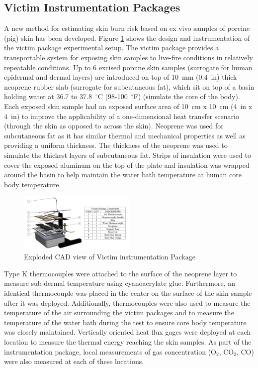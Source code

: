 \documentclass[12pt,oneside]{book}
\begin{document}
\subsection{Victim Instrumentation Packages}
A new method for estimating skin burn risk based on ex vivo samples of porcine (pig) skin has been developed. Figure \ref{fig:inst_SBA} shows the design and instrumentation of the victim package experimental setup. The victim package provides a transportable system for exposing skin samples to live-fire conditions in relatively repeatable conditions.  Up to 6 excised porcine skin samples (surrogate for human epidermal and dermal layers) are introduced on top of 10~mm (0.4~in) thick neoprene rubber slab (surrogate for subcutaneous fat), which sit on top of a basin holding water at 36.7 to 37.8~$^\circ$C (98-100~$^\circ$F) (simulate the core of the body).  Each exposed skin sample had an exposed surface area of 10~cm x 10~cm (4~in x 4~in) to improve the applicability of a one-dimensional heat transfer scenario (through the skin as opposed to across the skin).  Neoprene was used for subcutaneous fat as it has similar thermal and mechanical properties as well as providing a uniform thickness. The thickness of the neoprene was used to simulate the thickest layers of subcutaneous fat. Strips of insulation were used to cover the exposed aluminum on the top of the plate and insulation was wrapped around the basin to help maintain the water bath temperature at human core body temperature. 


\begin{figure}[H]
\centering
\includegraphics[width=0.5\textwidth]{../0_Images/Instrumentation/Burn_Measurements/Skin_Burn_Assessment_Package}
\caption{Exploded CAD view of Victim instrumentation Package}
\label{fig:inst_SBA}
\end{figure}

Type K thermocouples were attached to the surface of the neoprene layer to measure sub-dermal temperature using cyanoacrylate glue.  Furthermore, an identical thermocouple was placed in the center on the surface of the skin sample after it was deployed.  Additionally, thermocouples were also used to measure the temperature of the air surrounding the victim packages and to measure the temperature of the water bath during the test to ensure core body temperature was closely maintained.  Vertically oriented heat flux gages were deployed at each location to measure the thermal energy reaching the skin samples.  As part of the instrumentation package, local measurements of gas concentration (O$_2$, CO$_2$, CO) were also measured at each of these locations.
\end{document}
